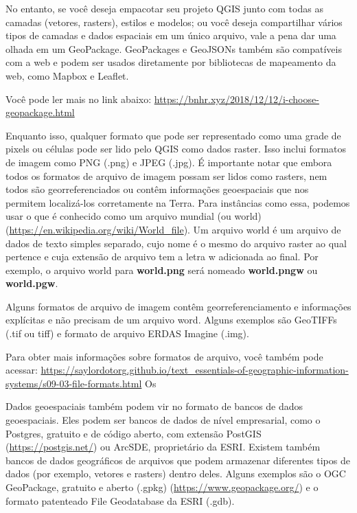 \documentclass[
]{krantz}
\begin{document}
No entanto, se você deseja empacotar seu projeto QGIS junto com todas as camadas (vetores, rasters), estilos e modelos; ou você deseja compartilhar vários tipos de camadas e dados espaciais em um único arquivo, vale a pena dar uma olhada em um GeoPackage. GeoPackages e GeoJSONs também são compatíveis com a web e podem ser usados diretamente por bibliotecas de mapeamento da web, como Mapbox e Leaflet.

Você pode ler mais no link abaixo: \href{https://bnhr.xyz/2018/12/12/i-choose\%20-geopackage.html}{https://bnhr.xyz/2018/12/12/i-choose-geopackage.html}

Enquanto isso, qualquer formato que pode ser representado como uma grade de pixels ou células pode ser lido pelo QGIS como dados raster. Isso inclui formatos de imagem como PNG (.png) e JPEG (.jpg). É importante notar que embora todos os formatos de arquivo de imagem possam ser lidos como rasters, nem todos são georreferenciados ou contêm informações geoespaciais que nos permitem localizá-los corretamente na Terra. Para instâncias como essa, podemos usar o que é conhecido como um arquivo mundial (ou world) (\url{https://en.wikipedia.org/wiki/World_file}). Um arquivo world é um arquivo de dados de texto simples separado, cujo nome é o mesmo do arquivo raster ao qual pertence e cuja extensão de arquivo tem a letra w adicionada ao final. Por exemplo, o arquivo world para \textbf{world.png} será nomeado \textbf{world.pngw} ou \textbf{world.pgw}.

Alguns formatos de arquivo de imagem contêm georreferenciamento e informações explícitas e não precisam de um arquivo word. Alguns exemplos são GeoTIFFs (.tif ou tiff) e formato de arquivo ERDAS Imagine (.img).

Para obter mais informações sobre formatos de arquivo, você também pode acessar: \href{https://saylordotorg.\%20github.io/text_essentials-of-geographic-information-systems/s09-03-file-formats.html}{https://saylordotorg.github.io/text\_essentials-of-geographic-information-systems/s09-03-file-formats.html} Os

Dados geoespaciais também podem vir no formato de bancos de dados geoespaciais. Eles podem ser bancos de dados de nível empresarial, como o Postgres, gratuito e de código aberto, com extensão PostGIS (\url{https://postgis.net/}) ou ArcSDE, proprietário da ESRI. Existem também bancos de dados geográficos de arquivos que podem armazenar diferentes tipos de dados (por exemplo, vetores e rasters) dentro deles. Alguns exemplos são o OGC GeoPackage, gratuito e aberto (.gpkg) (\url{https://www.geopackage.org/}) e o formato patenteado File Geodatabase da ESRI (.gdb).
\end{document}
